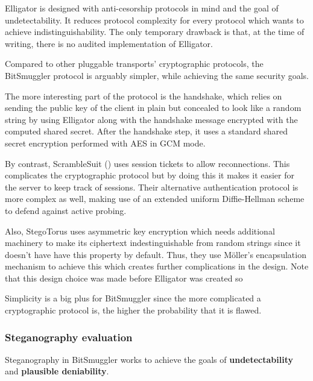 \documentclass[11pt]{book} %
\newcommand{\projectName}{BitSmuggler }
\begin{document}
Elligator is designed with anti-cesorship protocols in mind and the goal of undetectability. It reduces protocol complexity \citep*{elligator} for every protocol which wants to achieve indistinguishability. The only temporary drawback is that, at the time of writing, there is no audited implementation of Elligator.


Compared to other pluggable transports' cryptographic protocols, the \projectName protocol is arguably simpler, while achieving the same security goals.

The more interesting part of the protocol is the handshake, which relies on sending the public key of the client in plain but concealed to look like a random string by using Elligator along with the handshake message encrypted with the computed shared secret. After the handshake step, it uses a standard shared secret encryption performed with AES in GCM mode. 

By contrast, ScrambleSuit (\citep*{scrambleSuit}) uses session tickets to allow reconnections. This complicates the cryptographic protocol but by doing this it makes it easier for the server to keep track of sessions. Their alternative authentication protocol is more complex as well, making use of an extended uniform Diffie-Hellman scheme to defend against active probing.

Also, StegoTorus \citep*{stegotorus} uses asymmetric key encryption which needs additional machinery to make its ciphertext indestinguishable from random strings since it doesn't have have this property by default. Thus, they use M\"{o}ller's encapsulation mechanism to achieve this which creates further complications in the design. Note that this design choice was made before Elligator was created so

Simplicity is a big plus for \projectName since the more complicated a cryptographic protocol is, the higher the probability that it is flawed.


\subsubsection{Steganography evaluation}
\label{eval:steg}

Steganography in \projectName works to achieve the goals of \textbf{undetectability} and \textbf{plausible deniability}.
\end{document}
